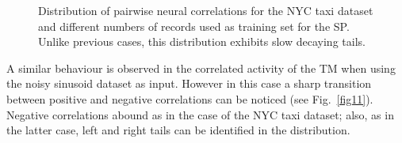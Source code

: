 \documentclass[11pt,letterpaper]{article}
\begin{document}
\begin{figure}[t]
{	    			\label{fig10:c}
		    	}
			    \caption{
			        Distribution of pairwise neural correlations for the NYC taxi dataset and
			        different numbers of records used as training set for the SP.
			        Unlike previous cases, this distribution exhibits slow decaying tails.
			    }
			    \label{fig10}
		    \end{figure}	
		    
		    A similar behaviour is observed in the correlated activity of the TM when using the
		    noisy sinusoid dataset as input.
		    However in this case a sharp transition between positive and negative correlations
		    can be noticed (see Fig.~\ref{fig11}).
		    Negative correlations abound as in the case of the NYC taxi dataset; also, as in the
		    latter case, left and right tails can be identified in the distribution.
\end{document}

